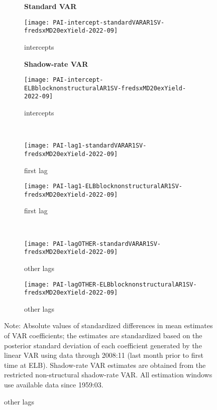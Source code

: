 \documentclass[12pt]{article}
\newlength{\picwid}
\begin{document}
\begin{figure}
\setlength{\picwid}{.4\textwidth}
\caption{Parameter changes over time (ex yields)}
\label{fig:PAIsinceGFC0:exyield}
\begin{center}
\begin{subfigure}[b]{\picwid}
\centering\textbf{Standard VAR}\vspace{0.5\baselineskip}
\caption{intercepts}
\label{subfig:exyield:pai:standard:intercepts}
\texttt{[image: PAI-intercept-standardVARAR1SV-fredsxMD20exYield-2022-09]}
\end{subfigure}
\quad
\begin{subfigure}[b]{\picwid}
\centering\textbf{Shadow-rate VAR}\vspace{0.5\baselineskip}
\caption{intercepts}
\label{subfig:exyield:pai:nonstructural:intercepts}
\texttt{[image: PAI-intercept-ELBblocknonstructuralAR1SV-fredsxMD20exYield-2022-09]}
\end{subfigure}
\\
\begin{subfigure}[b]{\picwid}
\caption{first lag}
\label{subfig:exyield:pai:standard:lag1}
\texttt{[image: PAI-lag1-standardVARAR1SV-fredsxMD20exYield-2022-09]}
\end{subfigure}
\quad
\begin{subfigure}[b]{\picwid}
\caption{first lag}
\label{subfig:exyield:pai:nonstructural:lag1}
\texttt{[image: PAI-lag1-ELBblocknonstructuralAR1SV-fredsxMD20exYield-2022-09]}
\end{subfigure}
\\
\begin{subfigure}[b]{\picwid}
\caption{other lags}
\label{subfig:exyield:pai:standard:lagother}
\texttt{[image: PAI-lagOTHER-standardVARAR1SV-fredsxMD20exYield-2022-09]}
\end{subfigure}
\quad
\begin{subfigure}[b]{\picwid}
\caption{other lags}
\label{subfig:exyield:pai:nonstructural:lagother}
\texttt{[image: PAI-lagOTHER-ELBblocknonstructuralAR1SV-fredsxMD20exYield-2022-09]}
\end{subfigure}
\end{center}
Note: Absolute values of standardized differences in mean estimates of VAR coefficients; the estimates are standardized based on the posterior standard deviation of each coefficient generated by the linear VAR using data through 2008:11 (last month prior to first time at ELB). Shadow-rate VAR estimates are obtained from the restricted non-structural shadow-rate VAR. All estimation windows use available data since 1959:03.
\end{figure}
\end{document}

